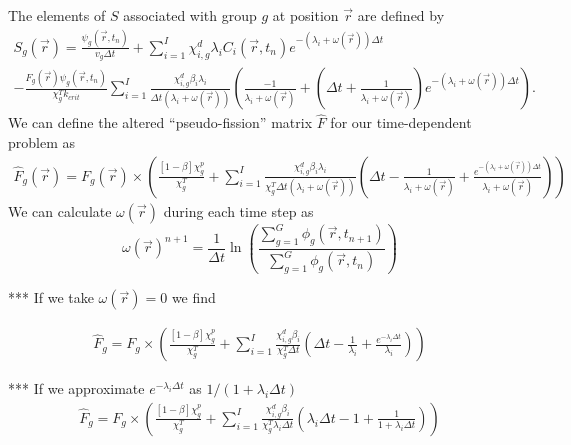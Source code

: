 \documentclass[12pt]{report}
\begin{document}
	The elements of $S$ associated with group $g$ at position $\vec{r}$ are defined by
	\begin{eqnarray}
	S_g(\vec{r}) = 	\frac{\psi_g(\vec{r},t_{n})}{v_g \Delta t} +  \sum_{i=1}^{I} \chi_{i,g}^d \lambda_i C_i(\vec{r},t_{n}) e^{-\left(\lambda_i + \omega(\vec{r})\right) \Delta t} \nonumber \\
	-  \frac{F_g(\vec{r}) \psi_g(\vec{r},t_{n})}{\chi_g^T k_{crit}} \sum_{i=1}^{I} \frac{\chi_{i,g}^d \beta_i \lambda_i}{\Delta t \left( \lambda_i + \omega(\vec{r}) \right)} \left( \frac{-1}{\lambda_i + \omega(\vec{r})} + \left(\Delta t + \frac{1}{\lambda_i + \omega(\vec{r})} \right)e^{-\left(\lambda_i + \omega(\vec{r}) \right) \Delta t} \right).
	\end{eqnarray}
	We can define the altered ``pseudo-fission'' matrix $\hat{F}$ for our time-dependent problem as
	\begin{eqnarray}
	\hat{F}_g(\vec{r}) = F_g(\vec{r}) \times \left(\frac{\left[ 1- \beta \right] \chi_g^p}{\chi_g^T} + \sum_{i=1}^{I} \frac{\chi_{i,g}^d \beta_i \lambda_i}{\chi_g^T \Delta t \left( \lambda_i + \omega(\vec{r}) \right)} \left( \Delta t - \frac{1}{\lambda_i + \omega(\vec{r})} + \frac{e^{-\left( \lambda_i + \omega(\vec{r}) \right) \Delta t}}{\lambda_i + \omega(\vec{r})}\right) \right) \nonumber
	\end{eqnarray}
	We can calculate $\omega(\vec{r})$ during each time step as
	\begin{equation}
	\omega(\vec{r})^{n+1} = \frac{1}{\Delta t} \ln \left(\frac{\sum_{g=1}^{G} \phi_g(\vec{r}, t_{n+1})}{\sum_{g=1}^{G} \phi_g(\vec{r}, t_{n})} \right)
	\end{equation}
	
	***  If we take $\omega(\vec{r}) = 0$ we find
	
	\begin{eqnarray}
	\hat{F}_g = F_g \times \left(\frac{\left[ 1- \beta \right] \chi_g^p}{\chi_g^T} + \sum_{i=1}^{I} \frac{\chi_{i,g}^d \beta_i}{\chi_g^T \Delta t} \left( \Delta t - \frac{1}{\lambda_i} + \frac{e^{- \lambda_i \Delta t}}{\lambda_i}\right) \right) \nonumber
	\end{eqnarray}	
	
	*** If we approximate $e^{-\lambda_i \Delta t}$ as $1 / (1+\lambda_i \Delta t)$
	\begin{eqnarray}
	\hat{F}_g = F_g \times \left(\frac{\left[ 1- \beta \right] \chi_g^p}{\chi_g^T} + \sum_{i=1}^{I} \frac{\chi_{i,g}^d \beta_i}{\chi_g^T \lambda_i \Delta t} \left( \lambda_i \Delta t - 1 + \frac{1}{1+\lambda_i \Delta t}\right) \right) \nonumber
	\end{eqnarray}	
	
\end{document}
